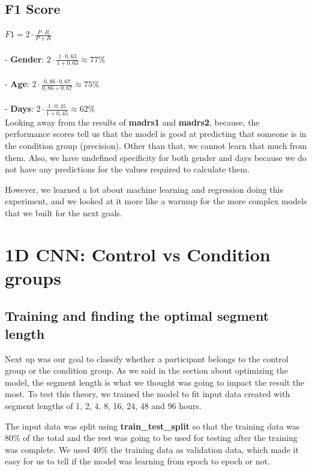 \subsection{F1 Score}
$ F1 = 2 \cdot \frac{P \cdot R}{P + R} $
\\\\
- \textbf{Gender}: $2 \cdot \frac{1 \cdot 0,63}{1 + 0,63} \approx 77\%$\\\\
- \textbf{Age}: $2 \cdot \frac{0,86 \cdot 0,67}{0,86 + 0,67} \approx 75\%$\\\\
- \textbf{Days}: $2 \cdot \frac{1 \cdot 0,45}{1 + 0,45} \approx 62\%$\\

Looking away from the results of \textbf{madrs1} and \textbf{madrs2}, because, the performance scores tell us that the model is good at predicting that someone is in the condition group (precision). Other than that, we cannot learn that much from them. Also, we have undefined specificity for both gender and days because we do not have any predictions for the values required to calculate them. 

However, we learned a lot about machine learning and regression doing this experiment, and we looked at it more like a warmup for the more complex models that we built for the next goals.

\section{1D CNN: Control vs Condition groups}

\subsection{Training and finding the optimal segment length}

Next up was our goal to classify whether a participant belongs to the control group or the condition group. As we said in the section about optimizing the model, the segment length is what we thought was going to impact the result the most. To test this theory, we trained the model to fit input data created with segment lengths of 1, 2, 4, 8, 16, 24, 48 and 96 hours. 

The input data was split using \textbf{train\_test\_split} so that the training data was 80\% of the total and the rest was going to be used for testing after the training was complete. We used 40\% the training data as validation data, which made it easy for us to tell if the model was learning from epoch to epoch or not. 

